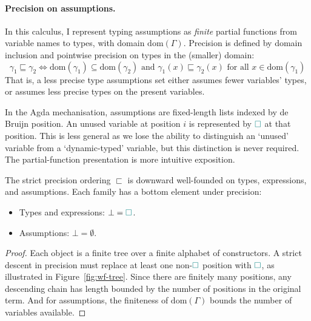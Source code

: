 \paragraph{Precision on assumptions.} In this calculus, I represent typing assumptions as \textit{finite} partial functions from variable names to types, with domain $\mathrm{dom}(\Gamma)$. Precision is defined by domain inclusion and pointwise precision on types in the (smaller) domain:
\[\gamma_1 \sqsubseteq \gamma_2 \iff \mathrm{dom}(\gamma_1) \subseteq \mathrm{dom}(\gamma_2) \text{ and } \gamma_1(x) \sqsubseteq \gamma_2(x) \text{ for all } x \in \mathrm{dom}(\gamma_1)\]
That is, a less precise type assumptions set either assumes fewer variables' types, or assumes less precise types on the present variables.

\begin{remark}\label{rem:assms-mechanisation}
In the Agda mechanisation, assumptions are fixed-length lists indexed by de Bruijn position. An unused variable at position $i$ is represented by ${\color{teal}\Box}$ at that position. This is less general as we lose the ability to distinguish an `unused' variable from a `dynamic-typed' variable, but this distinction is never required. The partial-function presentation is more intuitive exposition.
\end{remark}

\begin{proposition}\label{prop:precision-wf}
The strict precision ordering $\sqsubset$ is downward well-founded on types, expressions, and assumptions. Each family has a bottom element under precision:
\begin{itemize}
\item Types and expressions: $\bot = {\color{teal}\Box}$.
\item Assumptions: $\bot = \emptyset$.
\end{itemize}
\end{proposition}

\begin{proof}
Each object is a finite tree over a finite alphabet of constructors. A strict descent in precision must replace at least one non-${\color{teal}\Box}$ position with ${\color{teal}\Box}$, as illustrated in Figure~\ref{fig:wf-tree}. Since there are finitely many positions, any descending chain has length bounded by the number of positions in the original term. And for assumptions, the finiteness of $\mathrm{dom}(\Gamma)$ bounds the number of variables available.
\end{proof}


